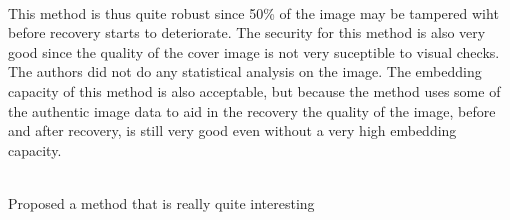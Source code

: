 \documentclass[a4paper]{article}
\begin{document}
\hspace{0pt} \\
This method \cite {korus2013efficient} is thus quite robust since 50\% of the image may be tampered wiht before recovery starts to deteriorate.
The security for this method is also very good since the quality of the cover image is not very suceptible to visual checks.
The authors did not do any statistical analysis on the image.
The embedding capacity of this method is also acceptable, but because the method uses some of the authentic image data to aid in the recovery the quality of the image, before and after recovery, is still very good even without a very high embedding capacity.  

\hspace{0pt} \\
\cite {tian2003high} Proposed a method that is really quite interesting



\end{document}
